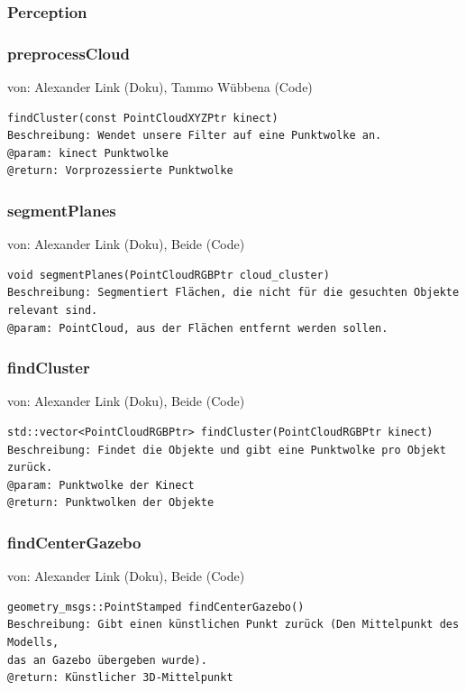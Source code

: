 \documentclass{suturo}
\makeatletter
\newcommand{\chapterauthor}[1]{%
  {\parindent0pt\vspace*{-27pt}%
  \linespread{0}\small\begin{flushright}von: #1\end{flushright}%
  \par\nobreak\vspace*{0pt}}
  \@afterheading%
}
\makeatother
\begin{document}
\subsubsection*{Perception}

\subsubsection{preprocessCloud}
\chapterauthor{Alexander Link (Doku), Tammo Wübbena (Code)}
\begin{verbatim}
findCluster(const PointCloudXYZPtr kinect)
Beschreibung: Wendet unsere Filter auf eine Punktwolke an.
@param: kinect Punktwolke
@return: Vorprozessierte Punktwolke
\end{verbatim}\label{func:preprocesscloud}

\subsubsection{segmentPlanes}
\chapterauthor{Alexander Link (Doku), Beide (Code)}
\begin{verbatim}
void segmentPlanes(PointCloudRGBPtr cloud_cluster)
Beschreibung: Segmentiert Flächen, die nicht für die gesuchten Objekte
relevant sind.
@param: PointCloud, aus der Flächen entfernt werden sollen.
\end{verbatim}\label{func:segmentplanes}

\subsubsection{findCluster}
\chapterauthor{Alexander Link (Doku), Beide (Code)}
\begin{verbatim}
std::vector<PointCloudRGBPtr> findCluster(PointCloudRGBPtr kinect)
Beschreibung: Findet die Objekte und gibt eine Punktwolke pro Objekt zurück.
@param: Punktwolke der Kinect
@return: Punktwolken der Objekte
\end{verbatim}\label{func:findcluster}

\subsubsection{findCenterGazebo}
\chapterauthor{Alexander Link (Doku), Beide (Code)}
\begin{verbatim}
geometry_msgs::PointStamped findCenterGazebo()
Beschreibung: Gibt einen künstlichen Punkt zurück (Den Mittelpunkt des
Modells, 
das an Gazebo übergeben wurde).
@return: Künstlicher 3D-Mittelpunkt
\end{verbatim}\label{func:findcentergazebo}
\end{document}
